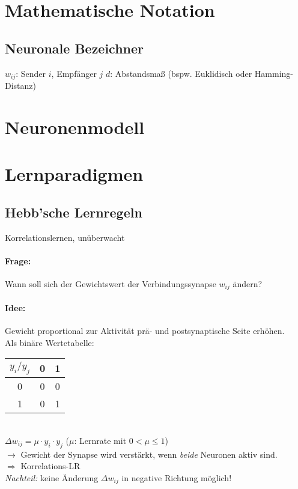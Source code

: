 \section{Mathematische Notation}
\subsection{Neuronale Bezeichner}
$w_{ij}$: Sender $i$, Empfänger $j$
$d$: Abstandsmaß (bspw. Euklidisch oder Hamming-Distanz)
\section{Neuronenmodell}
\section{Lernparadigmen}
\subsection{Hebb'sche  Lernregeln}
Korrelationslernen, unüberwacht
\begin{center}
\end{center}
\paragraph{Frage:} Wann soll sich der Gewichtswert der Verbindungssynapse $w_{ij}$ ändern?
\paragraph{Idee:} Gewicht proportional zur Aktivität prä- und postsynaptische Seite erhöhen.\bigskip\\
Als binäre Wertetabelle:\\
\begin{tabular}{c | c c}
$y_i / y_j$ & 0 & 1\\
\hline
0 & 0 & 0\\
1 & 0 & 1
\end{tabular}\\
$\Delta w_{ij} = \mu \cdot y_i \cdot y_j$ \qquad ($\mu$: Lernrate mit $0 < \mu \leq 1$)\\
$\to$ Gewicht der Synapse wird verstärkt, wenn \emph{beide} Neuronen aktiv sind.\\
$\Rightarrow$ Korrelations-LR\\
\emph{Nachteil:} keine Änderung $\Delta w_{ij}$ in negative Richtung möglich!


